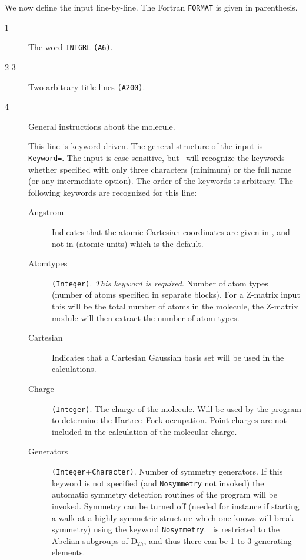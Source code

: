 We now define the input line-by-line.  The Fortran {\tt FORMAT} is given
in parenthesis.
\begin{description}
\item[1] The word \verb|INTGRL| {\tt (A6)}.
\item[2-3] Two arbitrary title lines {\tt (A200)}.
\item[4] General instructions about the molecule.

This line is keyword-driven. The general structure of the input is
\verb|Keyword=|. The input is case sensitive, but \dalton\ will recognize
the keywords whether specified with only three characters (minimum) or
the full name (or any intermediate option). The order of the keywords
is arbitrary. The following keywords are recognized for this line:
\begin{description}
\item[Angstrom] Indicates that the atomic Cartesian coordinates are
  given in \angstrom{}, and not in \bohr{} (atomic units) which is
  the default.
\item[Atomtypes] \verb|(Integer)|. {\em This keyword is
  required\/}. Number of atom types (number of atoms specified 
in separate blocks). For a Z-matrix input this will be the total
number of atoms in the molecule, the Z-matrix module will then
extract the number of atom types.
\item[Cartesian] Indicates that a Cartesian Gaussian basis set will be
  used in the calculations.
\item[Charge] \verb|(Integer)|. The charge of the molecule. Will be used  by the program to determine the Hartree--Fock
occupation.
Point charges are not included in the calculation of the molecular charge.
\item[Generators] \verb|(Integer|+\verb|Character)|. Number of symmetry
  generators. If this keyword is not
  specified (and \verb|Nosymmetry| not invoked)
  the automatic symmetry detection routines of the program will be
invoked. Symmetry can be turned off (needed for instance if starting a
walk at a highly symmetric structure which one knows will break
symmetry) using the keyword \verb|Nosymmetry|. \dalton\ is restricted
  to the Abelian subgroups of D$_{2h}$, and thus there can be 1 to 3
  generating elements.


\end{description}
\end{description}
